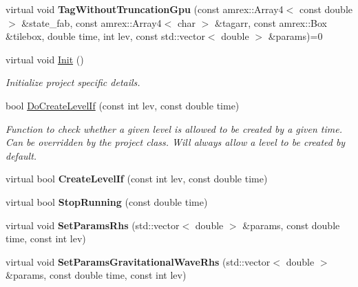 \begin{DoxyCompactItemize}
\mbox{\label{classsledgehamr_1_1Sledgehamr_acd89d0e95abb1c601a4622c400893c97}} 
virtual void {\bfseries Tag\+Without\+Truncation\+Gpu} (const amrex\+::\+Array4$<$ const double $>$ \&state\+\_\+fab, const amrex\+::\+Array4$<$ char $>$ \&tagarr, const amrex\+::\+Box \&tilebox, double time, int lev, const std\+::vector$<$ double $>$ \&params)=0
\item 
\mbox{\label{classsledgehamr_1_1Sledgehamr_a9c1605a42a34853ce9efb99f7be43a2a}} 
virtual void \mbox{\hyperlink{classsledgehamr_1_1Sledgehamr_a9c1605a42a34853ce9efb99f7be43a2a}{Init}} ()
\begin{DoxyCompactList}\small\item\em Initialize project specific details. \end{DoxyCompactList}\item 
bool \mbox{\hyperlink{classsledgehamr_1_1Sledgehamr_a55951d4d585f60943a265c02666a38c0}{Do\+Create\+Level\+If}} (const int lev, const double time)
\begin{DoxyCompactList}\small\item\em Function to check whether a given level is allowed to be created by a given time. Can be overridden by the project class. Will always allow a level to be created by default. \end{DoxyCompactList}\item 
\mbox{\label{classsledgehamr_1_1Sledgehamr_ac018ba7412bd5e0eebb4be64736aabba}} 
virtual bool {\bfseries Create\+Level\+If} (const int lev, const double time)
\item 
\mbox{\label{classsledgehamr_1_1Sledgehamr_a72dbd6348ab3dd777f80f005dada9d56}} 
virtual bool {\bfseries Stop\+Running} (const double time)
\item 
\mbox{\label{classsledgehamr_1_1Sledgehamr_a1fc21e49b69617b209794eb3aa7399d9}} 
virtual void {\bfseries Set\+Params\+Rhs} (std\+::vector$<$ double $>$ \&params, const double time, const int lev)
\item 
\mbox{\label{classsledgehamr_1_1Sledgehamr_ac17889590166ddca3944bfd28234ee99}} 
virtual void {\bfseries Set\+Params\+Gravitational\+Wave\+Rhs} (std\+::vector$<$ double $>$ \&params, const double time, const int lev)

\end{DoxyCompactItemize}

